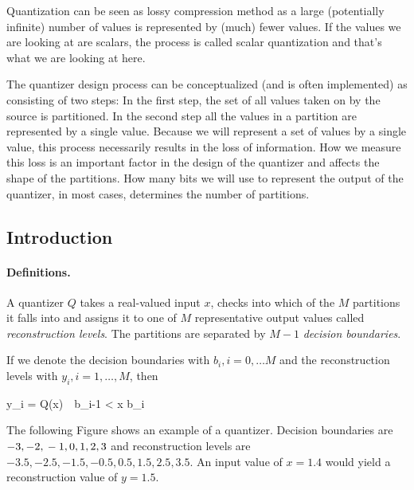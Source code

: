
Quantization can be seen as lossy compression method as a large (potentially infinite) number of values is represented by (much) fewer values. If the values we are looking at are scalars, the process is called scalar quantization and that's what we are looking at here.

The quantizer design process can be conceptualized (and is often implemented) as consisting of two steps: In the first step, the set of all values taken on by the source is partitioned. In the second step all the values in a partition are represented by a single value. Because we will represent a set of values by a single value, this process necessarily results in the loss of information. How we measure this loss is an important factor in the design of the quantizer and affects the shape of the partitions. How many bits we will use to represent the output of the quantizer, in most cases, determines the number of partitions.

\subsection{Introduction}

\paragraph{Definitions.} A quantizer $Q$ takes a real-valued input $x$, checks into which of the $M$ partitions it falls into and assigns it to one of $M$ representative output values called \emph{reconstruction levels}. The partitions are separated by $M-1$ \emph{decision boundaries}.

If we denote the decision boundaries with $b_i, i=0, \ldots M$ and the reconstruction levels with $y_i, i=1, \ldots, M$, then

\bee
y_i = Q(x) \quad {} \,\, b_{i-1} < x \leq b_i
\eee

The following Figure shows an example of a quantizer. Decision boundaries are $-3, -2, \\ -1, 0, 1, 2, 3$ and reconstruction levels are $-3.5, -2.5, -1.5, -0.5, 0.5, 1.5, 2.5, 3.5$. An input value of $x = 1.4$ would yield a reconstruction value of $y = 1.5$.

